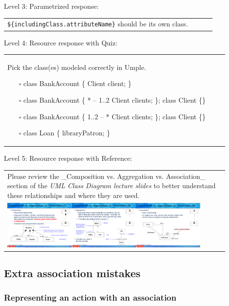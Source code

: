 \noindent Level 3: Parametrized response: \medskip

\begin{tabular}{|p{0.9\linewidth}}
\verb|${includingClass.attributeName}| should be its own class.
\end{tabular} \medskip

\noindent Level 4: Resource response with Quiz: \medskip

\begin{tabular}{|p{0.9\linewidth}}
Pick the class(es) modeled correctly in Umple.

\begin{itemize}
    \item[$\square$] class BankAccount \{ Client client; \}
    \item[$\square$] class BankAccount \{ * -- 1..2 Client clients; \}; class Client \{\}
    \item[$\square$] class BankAccount \{ 1..2 -- * Client clients; \}; class Client \{\}
    \item[$\square$] class Loan \{ libraryPatron; \}
\end{itemize}

\end{tabular} \medskip

\noindent Level 5: Resource response with Reference: \medskip

\begin{tabular}{|p{0.9\linewidth}}
Please review the _Composition vs. Aggregation vs. Association_ section of 
the \textit{UML Class Diagram lecture slides} to 
better understand these relationships and where they are used.

\\
\includegraphics[width=0.9\textwidth]{images/composition_aggregation_association.png}
\end{tabular} \medskip


\subsection{Extra association mistakes}

\subsubsection{Representing an action with an association}

